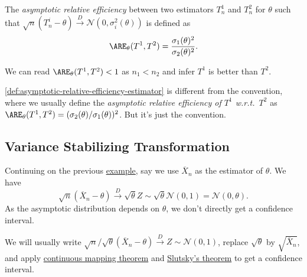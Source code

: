 \begin{definition}\label{def:asymptotic-relative-efficiency-estimator}
	The \emph{asymptotic relative efficiency} between two estimators \(T^1_n\) and \(T^2_n\) for \(\theta \) such that \(\sqrt{n} (T_n^i - \theta ) \overset{D}{\to} \mathcal{N} (0, \sigma _i^2(\theta ))\) is defined as
	\[
		\ARE_\theta (T^1, T^2)
		= \frac{\sigma _1(\theta )^2}{\sigma _2(\theta )^2}.
	\]
\end{definition}

\begin{intuition}
	We can read \(\ARE_\theta (T^1, T^2) < 1\) as \(n_1 < n_2\) and infer \(T^1\) is better than \(T^2\).
\end{intuition}

\begin{note}
	\autoref{def:asymptotic-relative-efficiency-estimator} is different from the convention, where we usually define the \emph{asymptotic relative efficiency of \(T^1\) w.r.t.\ \(T^2\)} as \(\ARE_\theta (T^1, T^2) = (\sigma _2(\theta ) / \sigma _1(\theta ))^2\). But it's just the convention.
\end{note}

\subsection{Variance Stabilizing Transformation}
Continuing on the previous \hyperref[eg:ARE]{example}, say we use \(\overline{X} _n\) as the estimator of \(\theta \). We have
\[
	\sqrt{n} (\overline{X} _n - \theta ) \overset{D}{\to} \sqrt{\theta } Z \sim \sqrt{\theta } \mathcal{N} (0, 1) = \mathcal{N} (0, \theta ) .
\]
As the asymptotic distribution depends on \(\theta \), we don't directly get a confidence interval.

\begin{prev}
	We will usually write \(\sqrt{n} / \sqrt{\theta } (\overline{X} _n - \theta ) \overset{D}{\to} Z \sim \mathcal{N} (0, 1)\), replace \(\sqrt{\theta } \) by \(\sqrt{\overline{X} _n} \), and apply \hyperref[thm:continuous-mapping]{continuous mapping theorem} and \hyperref[thm:Slutsky]{Slutsky's theorem} to get a confidence interval.
\end{prev}

